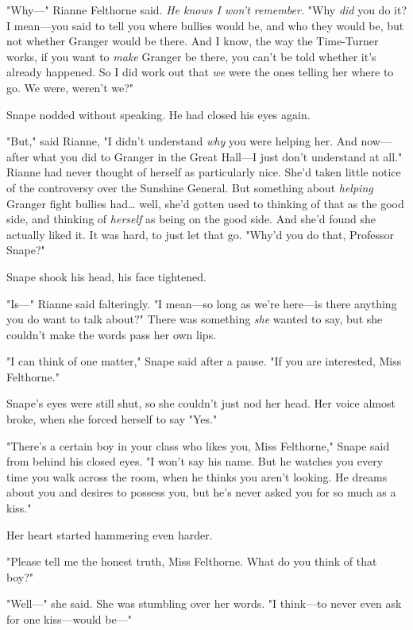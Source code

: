 "Why---" Rianne Felthorne said. \emph{He knows I won't remember.} "Why 
\emph{did} you do it? I mean---you said to tell you where bullies would be, and 
who they would be, but not whether Granger would be there. And I know, the way 
the Time-Turner works, if you want to \emph{make} Granger be there, you can't 
be told whether it's already happened. So I did work out that \emph{we} were 
the ones telling her where to go. We were, weren't we?"

Snape nodded without speaking. He had closed his eyes again.

"But," said Rianne, "I didn't understand \emph{why} you were helping her. And 
now---after what you did to Granger in the Great Hall---I just don't understand 
at all." Rianne had never thought of herself as particularly nice. She'd taken 
little notice of the controversy over the Sunshine General. But something about 
\emph{helping} Granger fight bullies had{\ldots} well, she'd gotten used to 
thinking of that as the good side, and thinking of \emph{herself} as being on 
the good side. And she'd found she actually liked it. It was hard, to just let 
that go. "Why'd you do that, Professor Snape?"

Snape shook his head, his face tightened.

"Is---" Rianne said falteringly. "I mean---so long as we're here---is there 
anything you do want to talk about?" There was something \emph{she} wanted to 
say, but she couldn't make the words pass her own lips.

"I can think of one matter," Snape said after a pause. "If you are interested, 
Miss Felthorne."

Snape's eyes were still shut, so she couldn't just nod her head. Her voice 
almost broke, when she forced herself to say "Yes."

"There's a certain boy in your class who likes you, Miss Felthorne," Snape said 
from behind his closed eyes. "I won't say his name. But he watches you every 
time you walk across the room, when he thinks you aren't looking. He dreams 
about you and desires to possess you, but he's never asked you for so much as a 
kiss."

Her heart started hammering even harder.

"Please tell me the honest truth, Miss Felthorne. What do you think of that 
boy?"

"Well---" she said. She was stumbling over her words. "I think---to never even 
ask for one kiss---would be---"

